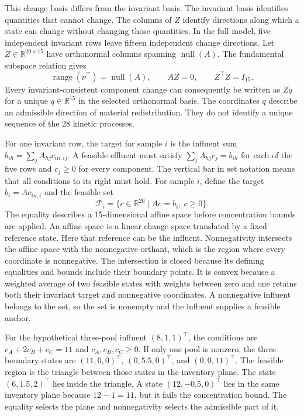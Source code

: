 This change basis differs from the invariant basis. The invariant basis identifies quantities that cannot change. The columns of $Z$ identify directions along which a state can change without changing those quantities. In the full model, five independent invariant rows leave fifteen independent change directions. Let $Z\in\mathbb{R}^{20\times15}$ have orthonormal columns spanning $\operatorname{null}(A)$. The fundamental subspace relation gives
\begin{equation}
\operatorname{range}(\nu^\top)=\operatorname{null}(A),\qquad
AZ=0,\qquad Z^\top Z=I_{15}.
\label{eq:reaction_invariant_subspaces}
\end{equation}
Every invariant-consistent component change can consequently be written as $Zq$ for a unique $q\in\mathbb{R}^{15}$ in the selected orthonormal basis. The coordinates $q$ describe an admissible direction of material redistribution. They do not identify a unique sequence of the 28 kinetic processes.

For one invariant row, the target for sample $i$ is the influent sum $b_{ih}=\sum_jA_{hj}c_{in,ij}$. A feasible effluent must satisfy $\sum_jA_{hj}c_j=b_{ih}$ for each of the five rows and $c_j\geq0$ for every component. The vertical bar in set notation means that all conditions to its right must hold. For sample $i$, define the target $b_i=Ac_{in,i}$ and the feasible set
\begin{equation}
\mathcal{F}_i=\{c\in\mathbb{R}^{20}\mid Ac=b_i,\ c\geq0\}.
\label{eq:reactor_feasible_set}
\end{equation}
The equality describes a 15-dimensional affine space before concentration bounds are applied. An affine space is a linear change space translated by a fixed reference state. Here that reference can be the influent. Nonnegativity intersects the affine space with the nonnegative orthant, which is the region where every coordinate is nonnegative. The intersection is closed because its defining equalities and bounds include their boundary points. It is convex because a weighted average of two feasible states with weights between zero and one retains both their invariant target and nonnegative coordinates. A nonnegative influent belongs to the set, so the set is nonempty and the influent supplies a feasible anchor.

For the hypothetical three-pool influent $(8,1,1)^\top$, the conditions are $c_A+2c_B+c_C=11$ and $c_A,c_B,c_C\geq0$. If only one pool is nonzero, the three boundary states are $(11,0,0)^\top$, $(0,5.5,0)^\top$, and $(0,0,11)^\top$. The feasible region is the triangle between those states in the inventory plane. The state $(6,1.5,2)^\top$ lies inside the triangle. A state $(12,-0.5,0)^\top$ lies in the same inventory plane because $12-1=11$, but it fails the concentration bound. The equality selects the plane and nonnegativity selects the admissible part of it.

